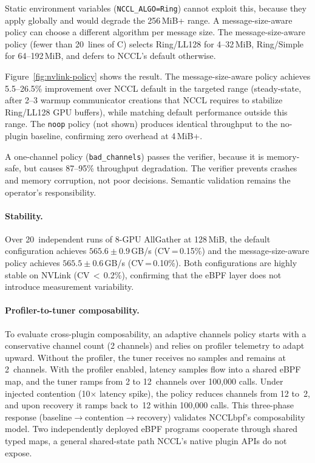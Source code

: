 \documentclass[sigplan,10pt]{acmart}
\newcommand{\sysname}{NCCLbpf\xspace}
\begin{document}
Static environment variables (\texttt{NCCL\_ALGO=Ring}) cannot
exploit this, because they apply globally and would degrade the 256\,MiB+
range. A message-size-aware policy can choose a different algorithm
per message size. The message-size-aware policy (fewer than 20~lines of C) selects
Ring/LL128 for 4--32\,MiB, Ring/Simple for 64--192\,MiB, and
defers to NCCL's default otherwise.

Figure~\ref{fig:nvlink-policy} shows the result. The message-size-aware policy
achieves 5.5--26.5\% improvement over NCCL default in the targeted
range (steady-state, after 2--3 warmup communicator creations that
NCCL requires to stabilize Ring/LL128 GPU buffers), while matching
default performance outside this range. The \texttt{noop} policy (not
shown) produces identical throughput to the no-plugin baseline,
confirming zero overhead at 4\,MiB+.

A one-channel policy (\texttt{bad\_channels})
passes the verifier, because it is memory-safe, but causes 87--95\%
throughput degradation. The verifier prevents crashes and
memory corruption, not poor decisions. Semantic validation remains
the operator's responsibility.

\paragraph{Stability.}
Over 20~independent runs of 8-GPU AllGather at 128\,MiB, the
default configuration achieves $565.6\pm0.9$\,GB/s
(CV\,=\,0.15\%) and the message-size-aware policy achieves
$565.5\pm0.6$\,GB/s (CV\,=\,0.10\%). Both configurations are
highly stable on NVLink (CV\,$<$\,0.2\%), confirming that the
eBPF layer does not introduce measurement variability.

\paragraph{Profiler-to-tuner composability.}
\label{sec:eval-composability}
To evaluate cross-plugin composability, an adaptive
channels policy starts with a conservative channel count
(2 channels) and relies on profiler telemetry to adapt
upward. Without the profiler, the tuner receives no samples and
remains at 2~channels. With the profiler enabled, latency samples
flow into a shared eBPF map, and the tuner ramps from 2 to
12~channels over 100{,}000 calls. Under injected contention
(10$\times$ latency spike), the policy reduces channels from 12
to~2, and upon recovery it ramps back to~12 within 100{,}000 calls.
This three-phase response (baseline$\to$contention$\to$recovery)
validates \sysname's composability model. Two independently
deployed eBPF programs cooperate through shared typed maps, a
general shared-state path NCCL's native plugin APIs do not expose.
\end{document}
